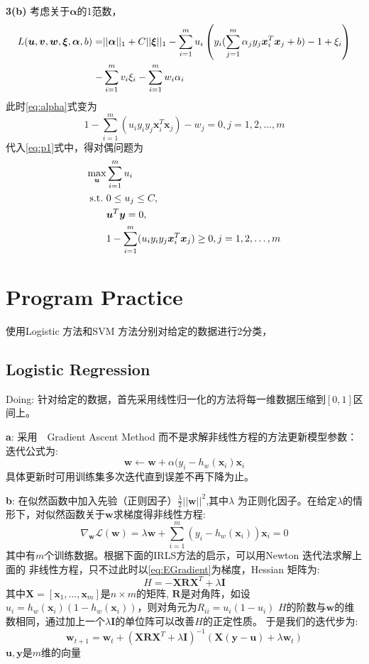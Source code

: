 \documentclass{article}
\begin{document}
\textbf{3(b)}
考虑关于$\bm{\alpha}$的1范数，
\begin{align}\notag
L(\bm{u},\bm{v},\bm{w},\bm{\xi},\bm{\alpha},b)=&
||\bm{\alpha}||_1+C ||\bm{\xi}||_1-\sum_{i=1}^m u_i
\left(y_i(\sum_{j=1}^m \alpha_j y_j \bm{x}_i^T\bm{x}_j +b)-1+\xi_i\right) \\
-&\sum_{i=1}^m v_i \xi_i -\sum_{i=1}^m w_i\alpha_i\label{eq:p1}
\end{align}
此时\eqref{eq:alpha}式变为
\begin{equation}
1-\sum_{i=1}^m (u_i y_iy_j \bm{x}_i^T\bm{x}_j)-w_j=0,j=1,2,\dots,m
\end{equation}
代入\eqref{eq:p1}式中，得对偶问题为
\begin{align}\notag
\max_{\bm{u}} & \sum_{i=1}^m u_i\\
\text{s.t.}\,\, & 0\leq u_j \leq C, \\
&\bm{u}^T\bm{y}=0,\\
&1-\sum_{i=1}^m (u_i y_iy_j \bm{x}_i^T\bm{x}_j)\geq 0,j=1,2,\dots,m
\end{align}

\section{Program Practice}
使用Logistic 方法和SVM 方法分别对给定的数据进行2分类，
\subsection{Logistic Regression}
Doing:
针对给定的数据，首先采用线性归一化的方法将每一维数据压缩到$[0,1]$区间上。

\textbf{a}:
采用　Gradient Ascent Method 而不是求解非线性方程的方法更新模型参数：
迭代公式为:
\begin{equation}
\bm{w}\leftarrow \bm{w}+\alpha(y_i-h_w(\bm{x}_i)\bm{x}_i
\end{equation}
具体更新时可用训练集多次迭代直到误差不再下降为止。

\textbf{b}:
在似然函数中加入先验（正则因子）$\frac{\lambda}{2} ||\bm{w}||^2$,其中$\lambda$
为正则化因子。在给定$\lambda$的情形下，对似然函数关于$\bm{w}$求梯度得非线性方程:
\begin{equation}\label{eq:EGradient}
\nabla_{\bm{w}}\mathcal{L}(\bm{w})=\lambda \bm{w}+\sum_{i=1}^{m}(y_i-h_w(\bm{x}_i))\bm{x}_i=0
\end{equation}
其中有$m$个训练数据。根据下面的IRLS方法的启示，可以用Newton 迭代法求解上面的
非线性方程，只不过此时以\eqref{eq:EGradient}为梯度，Hessian 矩阵为:
\begin{equation}
H=-\bm{X}\bm{R}\bm{X}^T+\lambda \bm{I}
\end{equation}
其中$\bm{X}=[\bm{x}_1,\dots,\bm{x}_m]$是$n\times m$的矩阵, 
$\bm{R}$是对角阵，如设$u_i=h_w(\bm{x}_i)(1-h_w(\bm{x}_i))$，则对角元为$R_{ii}=u_i(1-u_i)$
$H$的阶数与$\bm{w}$的维数相同，通过加上一个$\lambda \bm{I}$的单位阵可以改善$H$的正定性质。
于是我们的迭代步为:
\begin{equation}
\bm{w}_{t+1}=\bm{w}_t+(\bm{X}\bm{R}\bm{X}^T+\lambda \bm{I})^{-1}(\bm{X}(\bm{y}-\bm{u})+\lambda \bm{w}_t)
\end{equation}
$\bm{u},\bm{y}$是$m$维的向量
\end{document}
